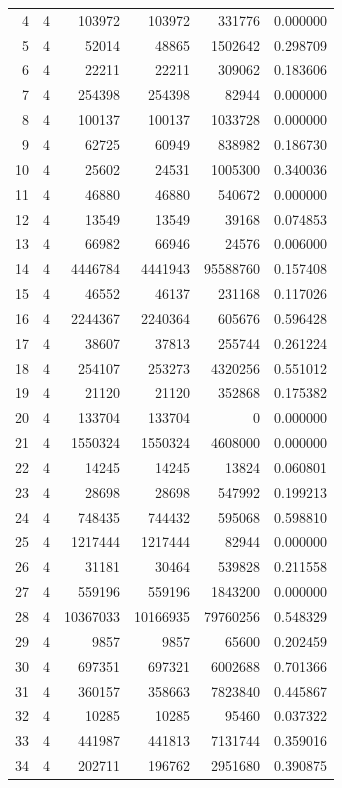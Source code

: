 \begin{longtable}{rrrrrr}
4 & 4 & 103972 & 103972 & 331776 & 0.000000\\
5 & 4 & 52014 & 48865 & 1502642 & 0.298709\\
6 & 4 & 22211 & 22211 & 309062 & 0.183606\\
7 & 4 & 254398 & 254398 & 82944 & 0.000000\\
8 & 4 & 100137 & 100137 & 1033728 & 0.000000\\
9 & 4 & 62725 & 60949 & 838982 & 0.186730\\
10 & 4 & 25602 & 24531 & 1005300 & 0.340036\\
11 & 4 & 46880 & 46880 & 540672 & 0.000000\\
12 & 4 & 13549 & 13549 & 39168 & 0.074853\\
13 & 4 & 66982 & 66946 & 24576 & 0.006000\\
14 & 4 & 4446784 & 4441943 & 95588760 & 0.157408\\
15 & 4 & 46552 & 46137 & 231168 & 0.117026\\
16 & 4 & 2244367 & 2240364 & 605676 & 0.596428\\
17 & 4 & 38607 & 37813 & 255744 & 0.261224\\
18 & 4 & 254107 & 253273 & 4320256 & 0.551012\\
19 & 4 & 21120 & 21120 & 352868 & 0.175382\\
20 & 4 & 133704 & 133704 & 0 & 0.000000\\
21 & 4 & 1550324 & 1550324 & 4608000 & 0.000000\\
22 & 4 & 14245 & 14245 & 13824 & 0.060801\\
23 & 4 & 28698 & 28698 & 547992 & 0.199213\\
24 & 4 & 748435 & 744432 & 595068 & 0.598810\\
25 & 4 & 1217444 & 1217444 & 82944 & 0.000000\\
26 & 4 & 31181 & 30464 & 539828 & 0.211558\\
27 & 4 & 559196 & 559196 & 1843200 & 0.000000\\
28 & 4 & 10367033 & 10166935 & 79760256 & 0.548329\\
29 & 4 & 9857 & 9857 & 65600 & 0.202459\\
30 & 4 & 697351 & 697321 & 6002688 & 0.701366\\
31 & 4 & 360157 & 358663 & 7823840 & 0.445867\\
32 & 4 & 10285 & 10285 & 95460 & 0.037322\\
33 & 4 & 441987 & 441813 & 7131744 & 0.359016\\
34 & 4 & 202711 & 196762 & 2951680 & 0.390875\\

\end{longtable}
